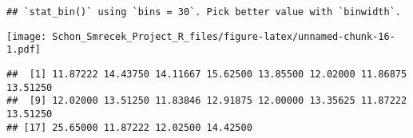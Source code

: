 \documentclass[
]{article}
\newenvironment{Shaded}{\begin{snugshade}}{\end{snugshade}}
\newcommand{\AttributeTok}[1]{\textcolor[rgb]{0.77,0.63,0.00}{#1}}
\newcommand{\CommentTok}[1]{\textcolor[rgb]{0.56,0.35,0.01}{\textit{#1}}}
\newcommand{\ConstantTok}[1]{\textcolor[rgb]{0.00,0.00,0.00}{#1}}
\newcommand{\ControlFlowTok}[1]{\textcolor[rgb]{0.13,0.29,0.53}{\textbf{#1}}}
\newcommand{\FloatTok}[1]{\textcolor[rgb]{0.00,0.00,0.81}{#1}}
\newcommand{\FunctionTok}[1]{\textcolor[rgb]{0.00,0.00,0.00}{#1}}
\newcommand{\NormalTok}[1]{#1}
\newcommand{\OtherTok}[1]{\textcolor[rgb]{0.56,0.35,0.01}{#1}}
\newcommand{\SpecialCharTok}[1]{\textcolor[rgb]{0.00,0.00,0.00}{#1}}
\begin{document}
\begin{verbatim}
## `stat_bin()` using `bins = 30`. Pick better value with `binwidth`.
\end{verbatim}

\texttt{[image: Schon\_Smrecek\_Project\_R\_files/figure-latex/unnamed-chunk-16-1.pdf]}

\begin{Shaded}
\end{Shaded}

\begin{verbatim}
##  [1] 11.87222 14.43750 14.11667 15.62500 13.85500 12.02000 11.86875 13.51250
##  [9] 12.02000 13.51250 11.83846 12.91875 12.00000 13.35625 11.87222 13.51250
## [17] 25.65000 11.87222 12.02500 14.42500
\end{verbatim}
\end{document}
